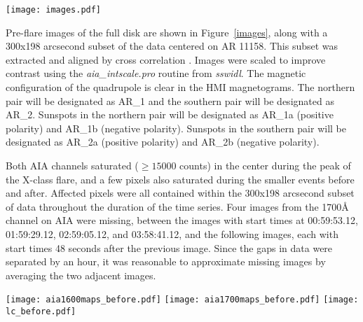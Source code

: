 \begin{figure*}[htb!]\centering
    \texttt{[image: images.pdf]}
    \caption{
        Images of active region 11158 in AIA 1600\AA{} (left panels),
        AIA 1700\AA{} (middle panels), and HMI LOS magnetogram (right panels),
        scaled to $\pm300$ Gauss.
        The top panels show the full disk,
        and the bottom panels show the region used for analysis in this study.
        \label{images}}
\end{figure*}


Pre-flare images of the full disk are shown in Figure~\ref{images},
along with a 300x198 arcsecond subset of the data centered on AR 11158.
{This subset was extracted and aligned by cross correlation}
\citep{McAteer2003,McAteer2004}.
Images were scaled to improve contrast using the
\textit{aia\_intscale.pro} routine from \textit{sswidl}.
The magnetic configuration of the quadrupole is clear in the HMI magnetograms.
The northern pair will be designated as AR\_1
and the southern pair will be designated as AR\_2.
Sunspots in the northern pair will be designated as AR\_1a (positive polarity)
and AR\_1b (negative polarity).
Sunspots in the southern pair will be designated as AR\_2a (positive polarity)
and AR\_2b (negative polarity).

Both AIA channels saturated ($\geq\!15000$ counts) in the center
during the peak of the X-class flare, and a few pixels also saturated
during the smaller events before and after.
Affected pixels were {all} contained within the
300x198 arcsecond {subset of data}
throughout the duration of the time series.
Four images from the 1700\AA{} channel on AIA were missing, between
the images with start times at
00:59:53.12,
01:59:29.12,
02:59:05.12, and
03:58:41.12, and the following images, each with start times
48 seconds after the previous image.
Since the gaps in data were separated by an hour,
it was reasonable to approximate {missing images}
by averaging the two adjacent images.
%
%
%






\begin{figure*}[htb!]\centering
    \texttt{[image: aia1600maps\_before.pdf]}
    \texttt{[image: aia1700maps\_before.pdf]}
    \texttt{[image: lc\_before.pdf]}
    \caption{%
        Spatial distribution of 3-minute power (arbitrary instrumental units)
        for AIA 1600\AA{} (top) and AIA 1700\AA{} (bottom)
        with the central frequency at 5.6 mHz ($\pm$ 0.5 mHz).
        The $x$ and $y$ dimensions are the same as the images in
        Figure~\ref{images}.
    \label{powermaps}}
\end{figure*}


